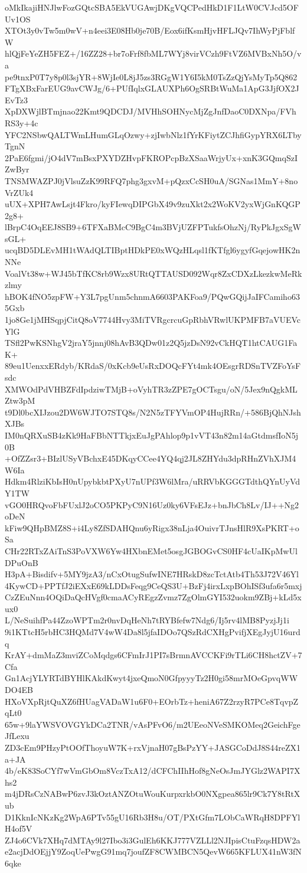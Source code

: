 oMkIkajiHNJlwFozGQtcSBA5EkVUGAwjDKgVQCPedHkD1F1LtW0CVJcd5OFUv1OS
XTOt3y0vTw5m0wV+n4eei3E08Hb0je70B/Eox6ifKsmHjvHFLJQv7IhWyPjFblfW
hlQjFeYeZH5FEZ+/16ZZ28+br7oFrf8fbML7WYj8virVCzh9FtVZ6MVBxNh5O/va
pe9tnxP0T7y8p0l3sjYR+8WjIe0L8jJ5zs3RGgW1Y6I5kM0TsZzQjYsMyTp5Q862
FTgXBxFarEUG9avCWJg/6+PUfIqlxGLAUXPh6OgSRBtWuMa1ApG3JjfOX2JEvTz3
XpDXWjlBTmjnao22Kmt9QDCDJ/MVHhSOHNycMjZgJnfDaoC0DXNpa/FVhRS3y+4c
YFC2NSbwQALTWmLHumGLqOzwy+zjIwbNlz1fYrKFiytZCJhfiGypYRX6LTbyTgnN
2PaE6fgmi/jO4dV7mBsxPXYDZHvpFKROPcpBzXSaaWrjyUx+xnK3GQmqSzIZwByr
TNSMWAZPJ0jVlsuZzK99RFQ7phg3gxvM+pQzxCcSH0uA/SGNas1MmY+8noVrZUk4
uUX+XPH7AwLsjt4Fkro/kyFIewqDIPGbX49v9zuXkt2x2WoKV2yxWjGnKQGP2g8+
lBrpC4OqEEJ8SB9+6TFXaBMcC9BgC4m3BVjUZFPTukfsOhzNj/RyPkJgxSgWsGL+
ucqBD5DLEvMH1tWAdQLTIBptHDkPE0xWQzHLqsl1fKTfgl6ygyfGqejowHK2nNNe
VoalVt38w+WJ45bTfKC8rb9Wzx8URtQTTAUSD092Wqr8ZxCDXzLkezkwMeRkzlmy
hBOK4fNO5zpFW+Y3L7pgUnm5chnmA6603PAKFoa9/PQwGQijJaIFCamiho635Gxb
1jo8Ge1jMHSqpjCitQ8oV7744Hvy3MiTVRgcrcuGpRbhVRwlUKPMFB7aVUEVcYlG
TSfl2PwKSNhgV2jraY5jnnj08hAvB3QDw01z2Q5jzDsN92vCkHQT1htCAUG1FaK+
89eu1UenxxERdyb/KRdaS/0xKcb9eUsRxDOQcFYt4mk4OEsgrRDSnTVZFoYsFsdc
XMWOdPdVHBZFdIpdziwTMjB+oVyhTR3zZPE7gOCTsgu/oN/5Jex9nQgkMLZtw3pM
t9Dl0bcXIJzou2DW6WJTO7STQ8s/N2N5zTFYVmOP4HujRRn/+586BjQhNJshXJBs
IM0nQRXuSB4zKk9HaFBbNTTkjxEuJgPAhlop9p1vVT43n82m14aGtdmsfIoN5j0B
+OfZZsr3+BIzlUSyVBchxE45DKqyCCee4YQ4qj2JL8ZHYdu3dpRHnZVhXJM4W6Ia
Hdkm4RlziKbIsH0nUpybkbtPXyU7nUPf3W6lMra/uRRVbKGGGTdthQYnUyVdY1TW
vGO0HRQvoFbFUxlJ2oCO5PKPyC9N16Uz0ky6VFsEJz+bnJbCh8Lv/IJ++Ng2oDeN
kFiw9QHpBMZ8S+i4Ly8ZfSDAHQnu6yRigx38nLja4OuivrTJnsHlR9XsPKRT+oSa
CHr22RTxZAiTnS3PoVXW6Yw4HXbnEMet5osgJGBOGvCS0HF4cUaIKpMwUlDPuOnB
H3pA+Bisdifv+5MY9jzA3/nCxOtugSufwINE7HRskD8zcTctAtb4Th53J72V46Yl
4KywCD+PPTfJ2iEXxE69kLDDsFeqg9CeQS3U+BzFj4irxLxpBOhISf3ufa6r5mxj
CzZEuNnn4OQiDaQcHVgf0cmaACyREgzZvmz7ZgOlmGYI532uokm9ZBj+kLd5xux0
L/NeSuihfPa44ZzoWPTm2r0nvDqHeNh7tRYBfefw7Ndg6/Ij5rv4lMB8PyzjJj1i
9i1KTtcH5rbHC3HQMd7V4wW4Da8l5jfaIDOo7QSzRdCXHgPvifjXEgJyjU16urdq
KrAY+dmMaZ3mviZCoMqdgs6CFmIrJ1PI7sBrmnAVCCKFi9rTLi6CH8hctZV+7Cfa
Gn1AcjYLYRTdBYHlKAkdKwyt4jxeQmoN0GfpyyyTz2H0gi58mrMOeGpvqWWDO4EB
HXoVXpRjtQuXZ6fHUagVADaW1u6F0+EOrbTz+heniA67Z2rzyR7PCe8TqvpZqLt0
65w+9laYWSVOVGYkDCa2TNR/vAsPFvO6/m2UEeoNVeSMKOMeq2GeichFgeJfLexu
ZD3cEm9PHzyPtOOfThoyuW7K+rxVjnaH07gBsPzYY+JASGCoDdJ8S44reZX1a+JA
4b/eK83SoCYf7wVmGbOm8VczTxA12/dCFChIIhHof8gNeOsJmJYGlz2WAPI7Xhs2
m4jDRsCzNABwP6zvJ3kOztANZOtuWouKurpxrkbO0NXgpea865lr9Ck7Y8tRtXub
D1KknIcNKzKg2WpA6PTv55gU16Rb3H8u/OT/PXtGfm7LObCaWRqH8DPFYlH4of5V
ZJ4o6CVk7XHq7dMTAy9l27Ibo3i3GulEh6KKJ777VZLLl2NJIpisCtuFzqsHDW2a
e2acjDdOEjjY9ZoqUePwgG91mq7joufZF8CWMBCN5QevW665KFLUX41nW3fN6qke
